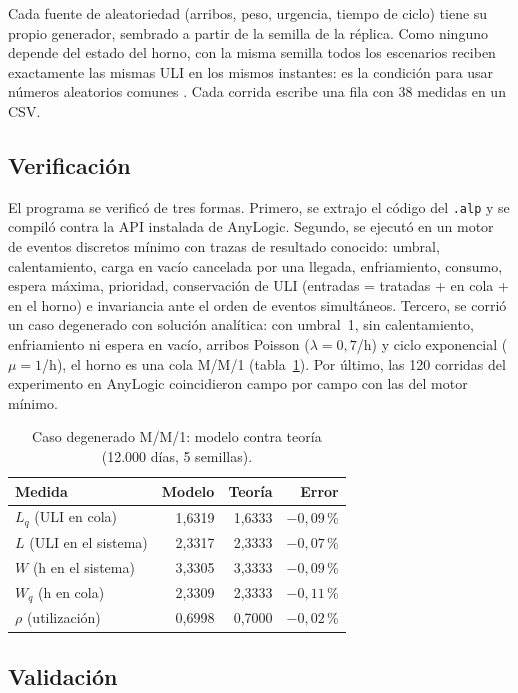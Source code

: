 \documentclass[a4paper,11pt]{article}
\begin{document}
Cada fuente de aleatoriedad (arribos, peso, urgencia, tiempo de ciclo) tiene su propio generador, sembrado a
partir de la semilla de la réplica. Como ninguno depende del estado del horno, con la misma semilla todos los
escenarios reciben exactamente las mismas ULI en los mismos instantes: es la condición para usar números
aleatorios comunes \citep[cap.~11]{law2015}. Cada corrida escribe una fila con 38 medidas en un CSV.

\subsection{Verificación}

El programa se verificó de tres formas. Primero, se extrajo el código del \texttt{.alp} y se compiló contra la
API instalada de AnyLogic. Segundo, se ejecutó en un motor de eventos discretos mínimo con trazas de resultado
conocido: umbral, calentamiento, carga en vacío cancelada por una llegada, enfriamiento, consumo, espera
máxima, prioridad, conservación de ULI (entradas = tratadas + en cola + en el horno) e invariancia ante el orden
de eventos simultáneos. Tercero, se corrió un caso degenerado con solución analítica: con umbral~1, sin
calentamiento, enfriamiento ni espera en vacío, arribos Poisson ($\lambda = 0{,}7$/h) y ciclo exponencial ($\mu
= 1$/h), el horno es una cola M/M/1 (tabla~\ref{tab:mm1}). Por último, las 120 corridas del experimento en
AnyLogic coincidieron campo por campo con las del motor mínimo.

\begin{table}[H]
\centering\small
\caption{Caso degenerado M/M/1: modelo contra teoría (12.000 días, 5 semillas).}
\label{tab:mm1}
\begin{tabular}{@{}lrrr@{}}
\toprule
Medida & Modelo & Teoría & Error \\
\midrule
$L_q$ (ULI en cola) & 1,6319 & 1,6333 & $-0{,}09$\,\% \\
$L$ (ULI en el sistema) & 2,3317 & 2,3333 & $-0{,}07$\,\% \\
$W$ (h en el sistema) & 3,3305 & 3,3333 & $-0{,}09$\,\% \\
$W_q$ (h en cola) & 2,3309 & 2,3333 & $-0{,}11$\,\% \\
$\rho$ (utilización) & 0,6998 & 0,7000 & $-0{,}02$\,\% \\
\bottomrule
\end{tabular}
\end{table}

\subsection{Validación}
\end{document}
